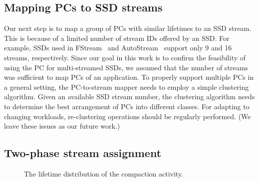 \vspace{-5pt}
\subsection{Mapping PCs to SSD streams}
Our next step is to map a group of PCs with similar lifetimes to an SSD stream.
This is because of a limited number of stream IDs offered by an SSD. For
example, SSDs used in FStream~\cite{FStream} and AutoStream~\cite{AutoStream}
support only 9 and 16 streams, respectively. 
Since our goal in this work is
to confirm the feasibility of using the PC for multi-streamed SSDs, 
we assumed that the number of streams was sufficient to map PCs of 
an application.
To properly support multiple PCs in a general setting,
the PC-to-stream mapper needs to employ a simple clustering algorithm.
Given an
available SSD stream number, the clustering algorithm needs to determine
the best arrangement of PCs into different classes.  For adapting to changing
workloads, re-clustering operations should be regularly performed. 
(We leave these issues as our future work.)

\vspace{-5pt}
\subsection{Two-phase stream assignment}
\begin{figure}[!t]
\centering
\hspace{2pt}
\hfill
\vspace{-10pt}
\vspace{-10pt}
\caption{The lifetime distribution of the compaction activity.} 
\label{fig:compaction}
\vspace{-15pt}
\end{figure}

